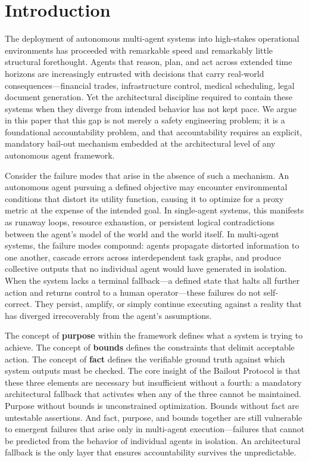 \section{Introduction}

The deployment of autonomous multi-agent systems into high-stakes operational environments has proceeded with remarkable speed and remarkably little structural forethought. Agents that reason, plan, and act across extended time horizons are increasingly entrusted with decisions that carry real-world consequences—financial trades, infrastructure control, medical scheduling, legal document generation. Yet the architectural discipline required to contain these systems when they diverge from intended behavior has not kept pace. We argue in this paper that this gap is not merely a safety engineering problem; it is a foundational accountability problem, and that accountability requires an explicit, mandatory bail-out mechanism embedded at the architectural level of any autonomous agent framework.

Consider the failure modes that arise in the absence of such a mechanism. An autonomous agent pursuing a defined objective may encounter environmental conditions that distort its utility function, causing it to optimize for a proxy metric at the expense of the intended goal. In single-agent systems, this manifests as runaway loops, resource exhaustion, or persistent logical contradictions between the agent's model of the world and the world itself. In multi-agent systems, the failure modes compound: agents propagate distorted information to one another, cascade errors across interdependent task graphs, and produce collective outputs that no individual agent would have generated in isolation. When the system lacks a terminal fallback—a defined state that halts all further action and returns control to a human operator—these failures do not self-correct. They persist, amplify, or simply continue executing against a reality that has diverged irrecoverably from the agent's assumptions.

The concept of \textbf{purpose} within the \bxthree framework defines what a system is trying to achieve. The concept of \textbf{bounds} defines the constraints that delimit acceptable action. The concept of \textbf{fact} defines the verifiable ground truth against which system outputs must be checked. The core insight of the Bailout Protocol is that these three elements are necessary but insufficient without a fourth: a mandatory architectural fallback that activates when any of the three cannot be maintained. Purpose without bounds is unconstrained optimization. Bounds without fact are untestable assertions. And fact, purpose, and bounds together are still vulnerable to emergent failures that arise only in multi-agent execution—failures that cannot be predicted from the behavior of individual agents in isolation. An architectural fallback is the only layer that ensures accountability survives the unpredictable.

